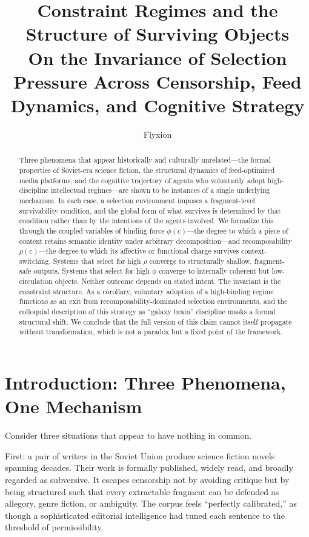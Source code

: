 \documentclass[12pt]{article}
\title{Constraint Regimes and the Structure of Surviving Objects\\
\large On the Invariance of Selection Pressure Across Censorship,
Feed Dynamics, and Cognitive Strategy}
\author{Flyxion}
\date{}
\newcommand{\bind}{\phi}
\newcommand{\recomp}{\rho}
\begin{document}
\maketitle

\begin{abstract}
Three phenomena that appear historically and culturally unrelated---the
formal properties of Soviet-era science fiction, the structural dynamics
of feed-optimized media platforms, and the cognitive trajectory of agents
who voluntarily adopt high-discipline intellectual regimes---are shown to
be instances of a single underlying mechanism. In each case, a selection
environment imposes a fragment-level survivability condition, and the
global form of what survives is determined by that condition rather than
by the intentions of the agents involved. We formalize this through the
coupled variables of binding force $\bind(c)$---the degree to which a
piece of content retains semantic identity under arbitrary
decomposition---and recomposability $\recomp(c)$---the degree to which
its affective or functional charge survives context-switching. Systems
that select for high $\recomp$ converge to structurally shallow,
fragment-safe outputs. Systems that select for high $\bind$ converge to
internally coherent but low-circulation objects. Neither outcome depends
on stated intent. The invariant is the constraint structure. As a
corollary, voluntary adoption of a high-binding regime functions as an
exit from recomposability-dominated selection environments, and the
colloquial description of this strategy as ``galaxy brain'' discipline
masks a formal structural shift. We conclude that the full version of
this claim cannot itself propagate without transformation, which is not a
paradox but a fixed point of the framework.
\end{abstract}

\newpage

\tableofcontents

\newpage

\section{Introduction: Three Phenomena, One Mechanism}
\label{sec:intro}

Consider three situations that appear to have nothing in common.

First: a pair of writers in the Soviet Union produce science fiction
novels spanning decades. Their work is formally published, widely read,
and broadly regarded as subversive. It escapes censorship not by avoiding
critique but by being structured such that every extractable fragment can
be defended as allegory, genre fiction, or ambiguity. The corpus feels
``perfectly calibrated,'' as though a sophisticated editorial intelligence
had tuned each sentence to the threshold of permissibility.
\end{document}

